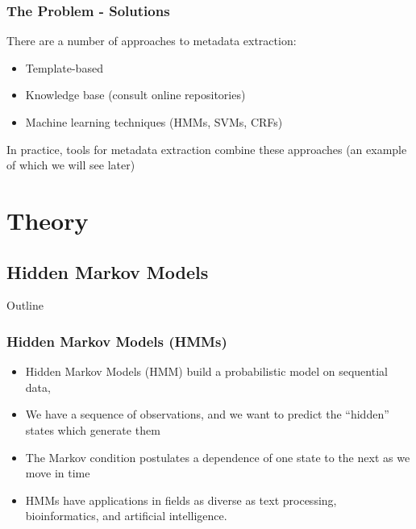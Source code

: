 \documentclass{beamer}
\begin{document}

\begin{frame}
\frametitle{The Problem - Solutions}
There are a number of approaches to metadata extraction:
\begin{itemize}
\item Template-based
\item Knowledge base (consult online repositories)
\item Machine learning techniques (HMMs, SVMs, CRFs)
\end{itemize}
In practice, tools for metadata extraction combine these approaches (an example of which we will see later) %
\end{frame}


\section{Theory}
\subsection{Hidden Markov Models}


\begin{frame}[noframenumbering]{Outline}
\tableofcontents[currentsubsection]
\end{frame}


\begin{frame}
\frametitle{Hidden Markov Models (HMMs)}
\begin{itemize}
\item Hidden Markov Models (HMM) build a probabilistic model on sequential data, 
\item We have a sequence of observations, and we want to predict the ``hidden'' states which generate them
\item The Markov condition postulates a dependence of one state to the next as we move in time
\item HMMs have applications in fields as diverse as text processing, bioinformatics, and artificial intelligence.
\end{itemize}
\end{frame}

\end{document}
